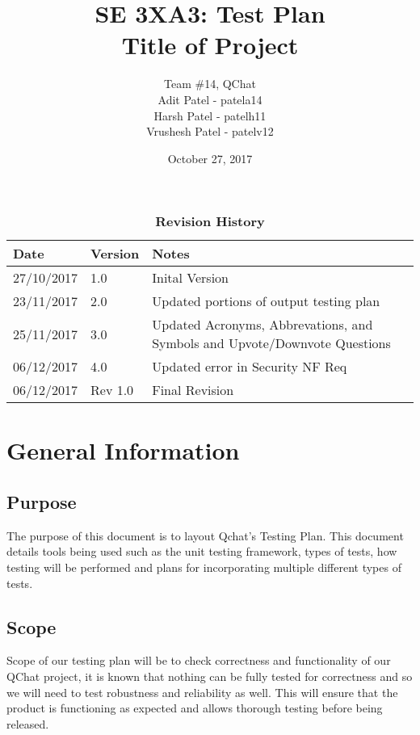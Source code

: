 \documentclass[12pt, titlepage]{article}
\title{SE 3XA3: Test Plan\\Title of Project}
\author{Team \#14, QChat
		\\ Adit Patel - patela14
		\\ Harsh Patel - patelh11
		\\ Vrushesh Patel - patelv12
}
\date{October 27, 2017}
\begin{document}
\maketitle

\tableofcontents
\listoftables
\listoffigures


\begin{table}[bp]
\caption{\bf Revision History}
\begin{tabularx}{\textwidth}{p{3cm}p{2cm}X}
\toprule {\bf Date} & {\bf Version} & {\bf Notes}\\
\midrule
27/10/2017 & 1.0 & Inital Version\\
23/11/2017 & 2.0 & Updated portions of output testing plan\\
25/11/2017 & 3.0 & Updated Acronyms, Abbrevations, and Symbols and Upvote/Downvote Questions\\
06/12/2017 & 4.0 & Updated error in Security NF Req\\
06/12/2017 & Rev 1.0 & Final Revision \\
\bottomrule
\end{tabularx}
\end{table}


\newpage


\section{General Information}

\subsection{Purpose}
The purpose of this document is to layout Qchat’s Testing Plan. This document details tools being used such as the unit testing framework, types of tests, how testing will be performed and plans for incorporating multiple different types of tests. 

\subsection{Scope}
Scope of our testing plan will be to check correctness and functionality of our QChat project, it is known that nothing can be fully tested for correctness and so we will need to test robustness and reliability as well. This will ensure that the product is functioning as expected and allows thorough testing before being released. 
\end{document}
